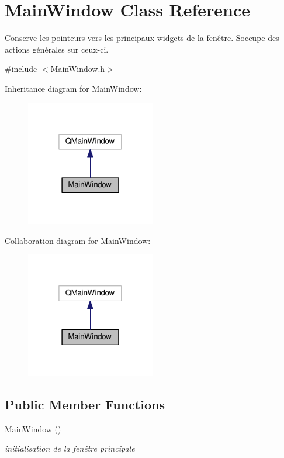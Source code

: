\hypertarget{class_main_window}{}\section{Main\+Window Class Reference}
\label{class_main_window}


Conserve les pointeurs vers les principaux widgets de la fenêtre. S\textquotesingle{}occupe des actions générales sur ceux-\/ci.  




{\ttfamily \#include $<$Main\+Window.\+h$>$}



Inheritance diagram for Main\+Window\+:\nopagebreak
\begin{figure}[H]
\begin{center}
\leavevmode
\includegraphics[width=160pt]{class_main_window__inherit__graph}
\end{center}
\end{figure}


Collaboration diagram for Main\+Window\+:\nopagebreak
\begin{figure}[H]
\begin{center}
\leavevmode
\includegraphics[width=160pt]{class_main_window__coll__graph}
\end{center}
\end{figure}
\subsection*{Public Member Functions}
\begin{DoxyCompactItemize}
\item 
\hypertarget{class_main_window_a34c4b4207b46d11a4100c9b19f0e81bb}{}\hyperlink{class_main_window_a34c4b4207b46d11a4100c9b19f0e81bb}{Main\+Window} ()\label{class_main_window_a34c4b4207b46d11a4100c9b19f0e81bb}

\begin{DoxyCompactList}\small\item\em initialisation de la fenêtre principale \end{DoxyCompactList}\end{DoxyCompactItemize}



